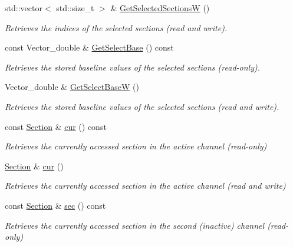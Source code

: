 \begin{DoxyCompactItemize}
std::vector$<$ std::size\_\-t $>$ \& \hyperlink{classRecording_a3a2e55e49d019c9de5b573e257086571}{GetSelectedSectionsW} ()
\begin{DoxyCompactList}\small\item\em Retrieves the indices of the selected sections (read and write). \item\end{DoxyCompactList}\item 
const Vector\_\-double \& \hyperlink{classRecording_ad30757741859eb3a2b0d80c30e015a45}{GetSelectBase} () const 
\begin{DoxyCompactList}\small\item\em Retrieves the stored baseline values of the selected sections (read-\/only). \item\end{DoxyCompactList}\item 
Vector\_\-double \& \hyperlink{classRecording_ac649aa3877a609ab03fbaa9b58a35233}{GetSelectBaseW} ()
\begin{DoxyCompactList}\small\item\em Retrieves the stored baseline values of the selected sections (read and write). \item\end{DoxyCompactList}\item 
const \hyperlink{classSection}{Section} \& \hyperlink{classRecording_a5a168245c7861f03f4b4cb648d2588ea}{cur} () const 
\begin{DoxyCompactList}\small\item\em Retrieves the currently accessed section in the active channel (read-\/only) \item\end{DoxyCompactList}\item 
\hyperlink{classSection}{Section} \& \hyperlink{classRecording_acf088ae10b8c31bf683fd9dcf28194ed}{cur} ()
\begin{DoxyCompactList}\small\item\em Retrieves the currently accessed section in the active channel (read and write) \item\end{DoxyCompactList}\item 
const \hyperlink{classSection}{Section} \& \hyperlink{classRecording_a8edc8e6dfd7e980cdcec94548e4727eb}{sec} () const 
\begin{DoxyCompactList}\small\item\em Retrieves the currently accessed section in the second (inactive) channel (read-\/only) \item\end{DoxyCompactList}\item 

\end{DoxyCompactItemize}
